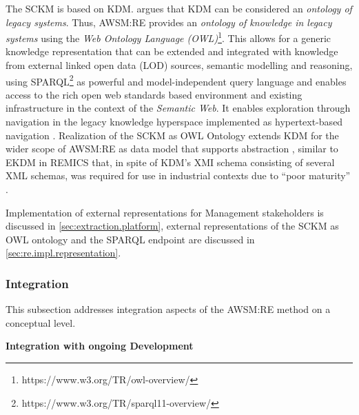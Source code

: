 The SCKM is based on KDM.
\autocite{Perez-Castillo2011KDM} argues that KDM can be considered an \emph{ontology of legacy systems}.
Thus, AWSM:RE provides an \emph{ontology of knowledge in legacy systems} using the \emph{Web Ontology Language (OWL)}\footnote{https://www.w3.org/TR/owl-overview/}.
This allows for a generic knowledge representation that can be extended and integrated with knowledge from external linked open data (LOD) sources, semantic modelling and reasoning, using SPARQL\footnote{https://www.w3.org/TR/sparql11-overview/} as powerful and model-independent query language and enables access to the rich open web standards based environment and existing infrastructure in the context of the \emph{Semantic Web}.
It enables exploration through navigation in the legacy knowledge hyperspace implemented as hypertext-based navigation \autocite{Tilley1996ProgramUnderstanding}.
Realization of the SCKM as OWL Ontology extends KDM for the wider scope of AWSM:RE as data model that supports abstraction \autocite{Tilley1996ProgramUnderstanding}, similar to EKDM in REMICS that, in spite of KDM's XMI schema consisting of several XML schemas, was required for use in industrial contexts due to ``poor maturity'' \autocite{Remics2013RecoverToolkit}.

Implementation of external representations for Management stakeholders is discussed in \cref{sec:extraction.platform}, external representations of the SCKM as OWL ontology and the SPARQL endpoint are discussed in \cref{sec:re.impl.representation}.

\hypertarget{sec:re.conceptual.integration}{%
\subsubsection{Integration}\label{sec:re.conceptual.integration}}

This subsection addresses integration aspects of the AWSM:RE method on a conceptual level.

\textbf{Integration with ongoing Development}

